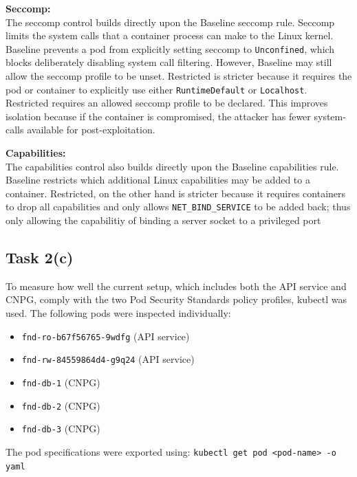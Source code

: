 \documentclass[11pt,a4paper]{article}
\begin{document}
	\textbf{Seccomp:}\\
	The seccomp control builds directly upon the Baseline seccomp rule. Seccomp limits the system calls that a container process can make to the Linux kernel. Baseline prevents a pod from explicitly setting seccomp to \texttt{Unconfined}, which blocks deliberately disabling system call filtering. However, Baseline may still allow the seccomp profile to be unset. Restricted is stricter because it requires the pod or container to explicitly use either \texttt{RuntimeDefault} or \texttt{Localhost}. Restricted requires an allowed seccomp profile to be declared. This improves isolation because if the container is compromised, the attacker has fewer system-calls available for post-exploitation.
	
	\textbf{Capabilities:}\\
	The capabilities control also builds directly upon the Baseline capabilities rule. Baseline restricts which additional Linux capabilities may be added to a container. Restricted, on the other hand is stricter because it requires containers to drop all capabilities and only allows \texttt{NET\_BIND\_SERVICE} to be added back; thus only allowing the capabilitiy of  binding a server socket to a privileged port\cite{Implementing the Principle of Least Privilege Using Linux Capabilities: Challenges and Perspectives}
	
	
	\subsection{Task 2(c)}
	
	To measure how well the current setup, which includes both the API service and CNPG, comply with the two Pod Security Standards policy profiles, kubectl was used. 
	The following pods were inspected individually:
	
	\begin{itemize}
		\item \texttt{fnd-ro-b67f56765-9wdfg} (API service)
		\item \texttt{fnd-rw-84559864d4-g9q24} (API service)
		\item \texttt{fnd-db-1} (CNPG)
		\item \texttt{fnd-db-2} (CNPG)
		\item \texttt{fnd-db-3} (CNPG)
	\end{itemize}
	
	The pod specifications were exported using: \texttt{kubectl get pod <pod-name> -o yaml}
	
\end{document}
